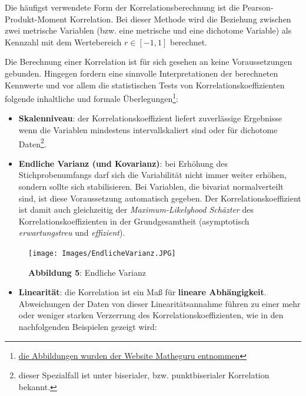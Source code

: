 \documentclass[]{article}
\providecommand{\tightlist}{%
  \setlength{\itemsep}{0pt}\setlength{\parskip}{0pt}}
\let\rmarkdownfootnote\footnote%
\def\footnote{\protect\rmarkdownfootnote}
\begin{document}
Die häufigst verwendete Form der Korrelationsberechnung ist die Pearson-Produkt-Moment Korrelation. Bei dieser Methode wird die Beziehung zwischen zwei metrische Variablen (bzw. eine metrische und eine dichotome Variable) als Kennzahl mit dem Wertebereich \(r \in [-1,1]\) berechnet.

Die Berechnung einer Korrelation ist für sich gesehen an keine Voraussetzungen gebunden. Hingegen fordern eine sinnvolle Interpretationen der berechneten Kennwerte und vor allem die statistischen Tests von Korrelationskoeffizienten folgende inhaltliche und formale Überlegungen\footnote{\href{https://matheguru.com/stochastik/korrelation-korrelationskoeffizient.html}{die Abbildungen wurden der Website Matheguru entnommen}}:

\begin{itemize}
\tightlist
\item
  \textbf{Skalenniveau}: der Korrelationskoeffizient liefert zuverlässige Ergebnisse wenn die Variablen mindestens intervallskaliert sind oder für dichotome Daten\footnote{dieser Spezialfall ist unter biserialer, bzw. punktbiserialer Korrelation bekannt.}.
\end{itemize}

\begin{itemize}
\tightlist
\item
  \textbf{Endliche Varianz (und Kovarianz)}: bei Erhöhung des Stichprobenumfangs darf sich die Variabilität nicht immer weiter erhöhen, sondern sollte sich stabilisieren. Bei Variablen, die bivariat normalverteilt sind, ist diese Voraussetzung automatisch gegeben. Der Korrelationskoeffizient ist damit auch gleichzeitig der \emph{Maximum-Likelyhood Schäzter} des Korrelationskoeffizienten in der Grundgesamtheit (asymptotisch \emph{erwartungstreu} und \emph{effizient}).
\end{itemize}

\begin{figure}
\centering
\texttt{[image: Images/EndlicheVarianz.JPG]}
\caption{\textbf{Abbildung 5}: Endliche Varianz}
\end{figure}

\begin{itemize}
\tightlist
\item
  \textbf{Linearität}: die Korrelation ist ein Maß für \textbf{lineare Abhängigkeit}. Abweichungen der Daten von dieser Linearitätsannahme führen zu einer mehr oder weniger starken Verzerrung des Korrelationskoeffizienten, wie in den nachfolgenden Beispielen gezeigt wird:
\end{itemize}
\end{document}
